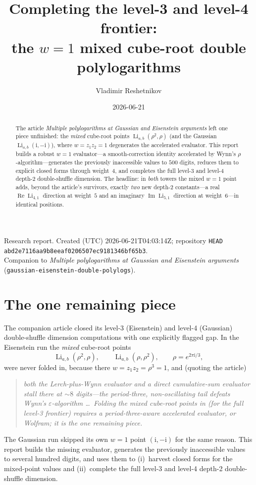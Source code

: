 \documentclass[11pt]{article}
\title{Completing the level-3 and level-4 frontier:\\
the $w=1$ mixed cube-root double polylogarithms}
\author{Vladimir Reshetnikov}
\date{2026-06-21}
\DeclareMathOperator{\Li}{Li}
\DeclareMathOperator{\Real}{Re}
\DeclareMathOperator{\Imag}{Im}
\newcommand{\iu}{\mathrm{i}}
\newcommand{\rr}{\rho}
\theoremstyle{plain}
\theoremstyle{remark}
\begin{document}
\maketitle

\begin{center}
\small
Research report. Created (UTC) 2026-06-21T04:03:14Z; repository \texttt{HEAD}
\texttt{abd2e7116aa9b8eeaf0206507ec9181346bf65b3}.\\
Companion to \emph{Multiple polylogarithms at Gaussian and Eisenstein arguments}
(\texttt{gaussian-eisenstein-double-polylogs}).
\end{center}

\begin{abstract}
The article \emph{Multiple polylogarithms at Gaussian and Eisenstein arguments} left one piece
unfinished: the \emph{mixed} cube-root points $\Li_{a,b}(\rr^2,\rr)$ (and the Gaussian
$\Li_{a,b}(\iu,-\iu)$), where $w=z_1z_2=1$ degenerates the accelerated evaluator. This report builds a
robust $w=1$ evaluator---a smooth-correction identity accelerated by Wynn's $\rho$-algorithm---generates
the previously inaccessible values to $500$ digits, reduces them to explicit closed forms through
weight~$4$, and completes the full level-3 and level-4 depth-2 double-shuffle dimension. The headline:
in \emph{both} towers the mixed $w=1$ point adds, beyond the article's survivors, exactly \emph{two} new
depth-2 constants---a real $\Real\Li_{4,1}$ direction at weight~$5$ and an imaginary $\Imag\Li_{5,1}$
direction at weight~$6$---in identical positions.
\end{abstract}

\section{The one remaining piece}\label{sec:intro}

The companion article closed its level-3 (Eisenstein) and level-4 (Gaussian) double-shuffle dimension
computations with one explicitly flagged gap. In the Eisenstein run the \emph{mixed} cube-root points
\[
  \Li_{a,b}(\rr^2,\rr),\qquad \Li_{a,b}(\rr,\rr^2),\qquad \rr=e^{2\pi\iu/3},
\]
were never folded in, because there $w=z_1z_2=\rr^3=1$, and (quoting the article)
\begin{quote}\itshape
both the Lerch-plus-Wynn evaluator and a direct cumulative-sum evaluator stall there at ${\sim}8$
digits---the period-three, non-oscillating tail defeats Wynn's $\varepsilon$-algorithm \dots\ Folding
the mixed cube-root points in (for the full level-3 frontier) requires a period-three-aware accelerated
evaluator, or Wolfram; it is the one remaining piece.
\end{quote}
The Gaussian run skipped its own $w=1$ point $(\iu,-\iu)$ for the same reason. This report builds the
missing evaluator, generates the previously inaccessible values to several hundred digits, and uses
them to (i)~harvest closed forms for the mixed-point values and (ii)~complete the full level-3 and
level-4 depth-2 double-shuffle dimension.
\end{document}
